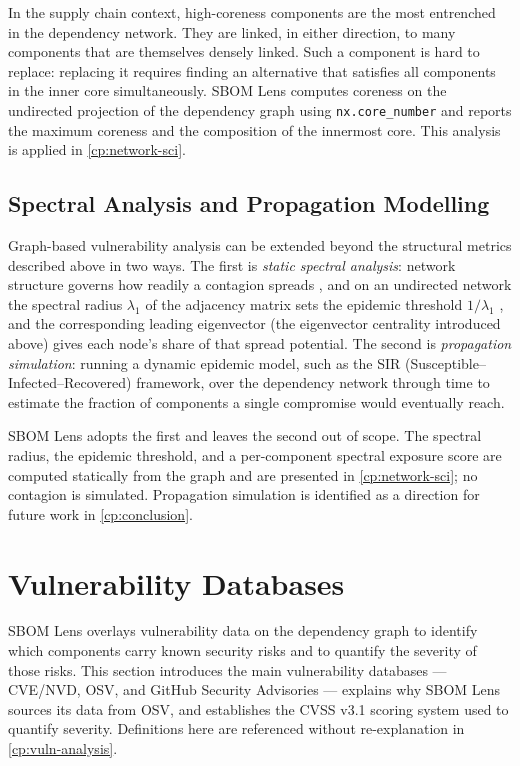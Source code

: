 In the supply chain context, high-coreness components are the most entrenched in the dependency network. They are linked, in either direction, to many components that are themselves densely linked. Such a component is hard to replace: replacing it requires finding an alternative that satisfies all components in the inner core simultaneously. SBOM Lens computes coreness on the undirected projection of the dependency graph using \texttt{nx.core\_number} and reports the maximum coreness and the composition of the innermost core. This analysis is applied in \autoref{cp:network-sci}.


\subsection{Spectral Analysis and Propagation Modelling}
\label{sec:propagation-modelling}

Graph-based vulnerability analysis can be extended beyond the structural metrics described above in two ways. The first is \textit{static spectral analysis}: network structure governs how readily a contagion spreads \citep{PastorSatorras2001}, and on an undirected network the spectral radius \(\lambda_1\) of the adjacency matrix sets the epidemic threshold \(1/\lambda_1\) \citep{Wang2003}, and the corresponding leading eigenvector (the eigenvector centrality introduced above) gives each node's share of that spread potential. The second is \textit{propagation simulation}: running a dynamic epidemic model, such as the SIR (Susceptible--Infected--Recovered) framework, over the dependency network through time to estimate the fraction of components a single compromise would eventually reach.

SBOM Lens adopts the first and leaves the second out of scope. The spectral radius, the epidemic threshold, and a per-component spectral exposure score are computed statically from the graph and are presented in \autoref{cp:network-sci}; no contagion is simulated. Propagation simulation is identified as a direction for future work in \autoref{cp:conclusion}.


\section{Vulnerability Databases}
\label{sec:vuln-databases}

SBOM Lens overlays vulnerability data on the dependency graph to identify which components carry known security risks and to quantify the severity of those risks. This section introduces the main vulnerability databases --- CVE/NVD, OSV, and GitHub Security Advisories --- explains why SBOM Lens sources its data from OSV, and establishes the CVSS v3.1 scoring system used to quantify severity. Definitions here are referenced without re-explanation in \autoref{cp:vuln-analysis}.


